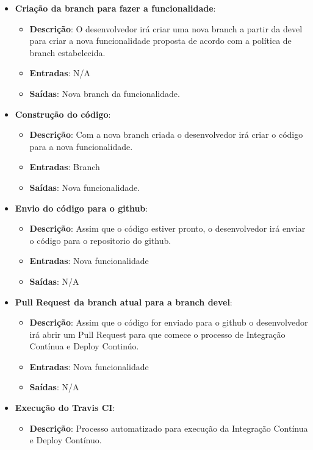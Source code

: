 \begin{itemize}
  \item \textbf{Criação da branch para fazer a funcionalidade}:
  \begin{itemize}
    \item \textbf{Descrição}: O desenvolvedor irá criar uma nova branch a partir da devel para criar a nova funcionalidade
      proposta de acordo com a política de branch estabelecida.
    \item \textbf{Entradas}: N/A
    \item \textbf{Saídas}: Nova branch da funcionalidade.
  \end{itemize}
  \item \textbf{Construção do código}:
  \begin{itemize}
    \item \textbf{Descrição}: Com a nova branch criada o desenvolvedor irá criar o código para a nova funcionalidade.
    \item \textbf{Entradas}: Branch
    \item \textbf{Saídas}: Nova funcionalidade.
  \end{itemize}
  \item \textbf{Envio do código para o github}:
  \begin{itemize}
    \item \textbf{Descrição}: Assim que o código estiver pronto, o desenvolvedor irá enviar o código para o repositorio do
    github.
    \item \textbf{Entradas}: Nova funcionalidade
    \item \textbf{Saídas}: N/A
  \end{itemize}
  \item \textbf{Pull Request da branch atual para a branch devel}:
  \begin{itemize}
    \item \textbf{Descrição}: Assim que o código for enviado para o github o desenvolvedor irá abrir um Pull Request para
    que comece o processo de Integração Contínua e Deploy Continúo.
    \item \textbf{Entradas}: Nova funcionalidade
    \item \textbf{Saídas}: N/A
  \end{itemize}
  \item \textbf{Execução do Travis CI}:
  \begin{itemize}
    \item \textbf{Descrição}: Processo automatizado para execução da Integração Contínua e Deploy Contínuo.

\end{itemize}
\end{itemize}
